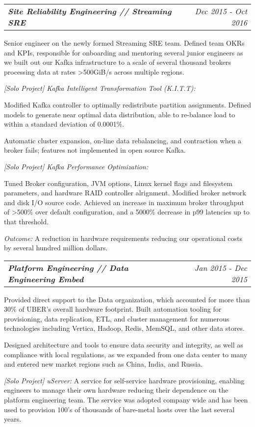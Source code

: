 \documentclass[10pt,letterpaper]{article}
\makeatletter
\newcommand{\area}[2]{\emph{#1:}   #2}
\newcommand{\subemployment}[3]{
	\headerrow
  {\hspace{8pt}\textbf{\emph{#1}}}
		{\emph{#2}}
  \vspace*{-15pt}
\begin{itemize*}
\item #3 
\end{itemize*}
}
\newcommand{\headerrow}[2]
{\begin{tabular*}{\linewidth}{l@{\extracolsep{\fill}}r}
	#1 &
	#2 \\
\end{tabular*}}
\makeatother
\begin{document}
{\subemployment
{Site Reliability Engineering // Streaming SRE}{Dec 2015 - Oct 2016}{
Senior engineer on the newly formed Streaming SRE team. Defined team OKRs and
KPIs, responsible for onboarding and mentoring several junior engineers as we
built out our Kafka infrastructure to a scale of several thousand brokers processing data
at rates >500GiB/s across multiple regions.
\item \area{[Solo Project] Kafka Intelligent Transformation Tool (K.I.T.T)}{
    \vspace*{-5pt}
    \begin{itemize*}
    \item Modified Kafka controller to optimally redistribute partition
      assignments. Defined models to generate near optimal data distribution,
      able to re-balance load to within a standard deviation of 0.0001\%.
    \item Automatic cluster expansion, on-line data rebalancing, and contraction
      when a broker fails; features not implemented in open source Kafka.
    \end{itemize*}
    \vspace*{-5pt}
    }
\item \area{[Solo Project] Kafka Performance Optimization}{
    \vspace*{-5pt}
    \begin{itemize*}
    \item Tuned Broker configuration, JVM options, Linux kernel flags and
      filesystem parameters, and hardware RAID controller alrignment. Modified
      broker network and disk I/O source code. Achieved an increase in maximum
      broker throughput of >500\% over default configuration, and a 5000\%
      decrease in p99 latencies up to that threshold.
    \item \emph{Outcome:} A reduction in hardware requirements reducing our operational costs by several hundred million dollars.
    \end{itemize*}
    \vspace*{-5pt}
    }
}

\subemployment
  {Platform Engineering // Data Engineering Embed}
  {Jan 2015 - Dec 2015}{
Provided direct support to the Data organization, which accounted for more than
30\% of UBER's overall hardware footprint. Built automation tooling for
provisioning, data replication, ETL, and cluster management for numerous
technologies including Vertica, Hadoop, Redis, MemSQL, and other data stores.
\item Designed architecture and tools to ensure data security and integrity, as well as
  compliance with local regulations, as we expanded from one data center to
  many and entered new market regions such as China, India, and Russia.
\item \area{[Solo Project] uServer} A service for self-service hardware
  provisioning, enabling engineers to manage their own hardware reducing their
  dependence on the platform engineering team. The service was  adopted company
  wide and has been used to provision 100’s of thousands of bare-metal hosts
  over the last several years.
}
}
\pagebreak
\end{document}
